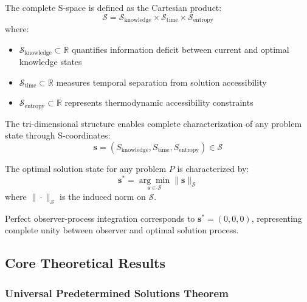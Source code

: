 ﻿\documentclass[11pt,a4paper]{article}
\begin{document}
\begin{definition}
The complete S-space is defined as the Cartesian product:
\begin{equation}
\mathcal{S} = \mathcal{S}_{\text{knowledge}} \times \mathcal{S}_{\text{time}} \times \mathcal{S}_{\text{entropy}}
\end{equation}
where:
\begin{itemize}
\item $\mathcal{S}_{\text{knowledge}} \subset \mathbb{R}$ quantifies information deficit between current and optimal knowledge states
\item $\mathcal{S}_{\text{time}} \subset \mathbb{R}$ measures temporal separation from solution accessibility  
\item $\mathcal{S}_{\text{entropy}} \subset \mathbb{R}$ represents thermodynamic accessibility constraints
\end{itemize}
\end{definition}

The tri-dimensional structure enables complete characterization of any problem state through S-coordinates:
\begin{equation}
\mathbf{s} = (S_{\text{knowledge}}, S_{\text{time}}, S_{\text{entropy}}) \in \mathcal{S}
\end{equation}

\begin{definition}
The optimal solution state for any problem $P$ is characterized by:
\begin{equation}
\mathbf{s}^* = \underset{\mathbf{s} \in \mathcal{S}}{\arg\min} \|\mathbf{s}\|_{\mathcal{S}}
\end{equation}
where $\|\cdot\|_{\mathcal{S}}$ is the induced norm on $\mathcal{S}$.
\end{definition}

Perfect observer-process integration corresponds to $\mathbf{s}^* = (0, 0, 0)$, representing complete unity between observer and optimal solution process.

\subsection{Core Theoretical Results}

\subsubsection{Universal Predetermined Solutions Theorem}
\end{document}
